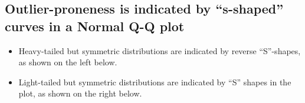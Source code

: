 \documentclass[
]{book}
\providecommand{\tightlist}{%
  \setlength{\itemsep}{0pt}\setlength{\parskip}{0pt}}
\begin{document}
\hypertarget{outlier-proneness-is-indicated-by-s-shaped-curves-in-a-normal-q-q-plot}{%
\subsection{Outlier-proneness is indicated by ``s-shaped'' curves in a Normal Q-Q plot}\label{outlier-proneness-is-indicated-by-s-shaped-curves-in-a-normal-q-q-plot}}

\begin{itemize}
\tightlist
\item
  Heavy-tailed but symmetric distributions are indicated by reverse ``S''-shapes, as shown on the left below.
\item
  Light-tailed but symmetric distributions are indicated by ``S'' shapes in the plot, as shown on the right below.
\end{itemize}
\end{document}
